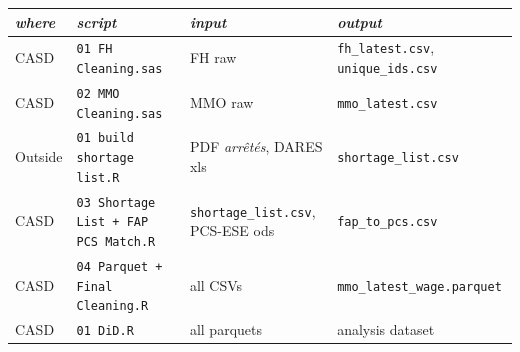 \documentclass[10pt, a4paper]{article}
\begin{document}
\begin{center}
\small
\begin{tabular}{llll}
\textit{where}
 & \textit{script} & \textit{input} & \textit{output} \\
\midrule
CASD & \texttt{01 FH Cleaning.sas}             & FH raw           & \texttt{fh\_latest.csv}, \texttt{unique\_ids.csv} \\
CASD & \texttt{02 MMO Cleaning.sas}            & MMO raw          & \texttt{mmo\_latest.csv} \\
Outside & \texttt{01 build shortage list.R}       & PDF \textit{arrêtés}, DARES xls & \texttt{shortage\_list.csv} \\
CASD & \texttt{03 Shortage List + FAP PCS Match.R} & \texttt{shortage\_list.csv}, PCS-ESE ods & \texttt{fap\_to\_pcs.csv} \\
CASD & \texttt{04 Parquet + Final Cleaning.R}  & all CSVs         & \texttt{mmo\_latest\_wage.parquet} \\
CASD & \texttt{01 DiD.R}                       & all parquets     & analysis dataset \\
\bottomrule
\end{tabular}
\end{center}
\bigskip
\end{document}
